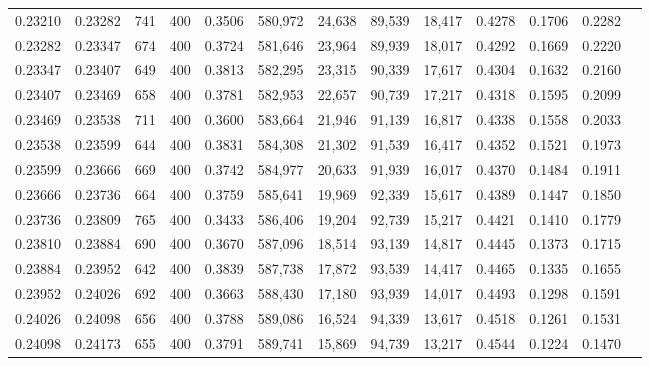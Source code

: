 \begin{tabular}{rrrrrrrrrrrrr}
0.23210 & 0.23282 &    741 &   400 &                                     0.3506 & 580,972 &  24,638 &  89,539 &  18,417 & 0.4278 & 0.1706 & 0.2282 \\
0.23282 & 0.23347 &    674 &   400 &                                     0.3724 & 581,646 &  23,964 &  89,939 &  18,017 & 0.4292 & 0.1669 & 0.2220 \\
0.23347 & 0.23407 &    649 &   400 &                                     0.3813 & 582,295 &  23,315 &  90,339 &  17,617 & 0.4304 & 0.1632 & 0.2160 \\
0.23407 & 0.23469 &    658 &   400 &                                     0.3781 & 582,953 &  22,657 &  90,739 &  17,217 & 0.4318 & 0.1595 & 0.2099 \\
0.23469 & 0.23538 &    711 &   400 &                                     0.3600 & 583,664 &  21,946 &  91,139 &  16,817 & 0.4338 & 0.1558 & 0.2033 \\
0.23538 & 0.23599 &    644 &   400 &                                     0.3831 & 584,308 &  21,302 &  91,539 &  16,417 & 0.4352 & 0.1521 & 0.1973 \\
0.23599 & 0.23666 &    669 &   400 &                                     0.3742 & 584,977 &  20,633 &  91,939 &  16,017 & 0.4370 & 0.1484 & 0.1911 \\
0.23666 & 0.23736 &    664 &   400 &                                     0.3759 & 585,641 &  19,969 &  92,339 &  15,617 & 0.4389 & 0.1447 & 0.1850 \\
0.23736 & 0.23809 &    765 &   400 &                                     0.3433 & 586,406 &  19,204 &  92,739 &  15,217 & 0.4421 & 0.1410 & 0.1779 \\
0.23810 & 0.23884 &    690 &   400 &                                     0.3670 & 587,096 &  18,514 &  93,139 &  14,817 & 0.4445 & 0.1373 & 0.1715 \\
0.23884 & 0.23952 &    642 &   400 &                                     0.3839 & 587,738 &  17,872 &  93,539 &  14,417 & 0.4465 & 0.1335 & 0.1655 \\
0.23952 & 0.24026 &    692 &   400 &                                     0.3663 & 588,430 &  17,180 &  93,939 &  14,017 & 0.4493 & 0.1298 & 0.1591 \\
0.24026 & 0.24098 &    656 &   400 &                                     0.3788 & 589,086 &  16,524 &  94,339 &  13,617 & 0.4518 & 0.1261 & 0.1531 \\
0.24098 & 0.24173 &    655 &   400 &                                     0.3791 & 589,741 &  15,869 &  94,739 &  13,217 & 0.4544 & 0.1224 & 0.1470 \\

\end{tabular}
